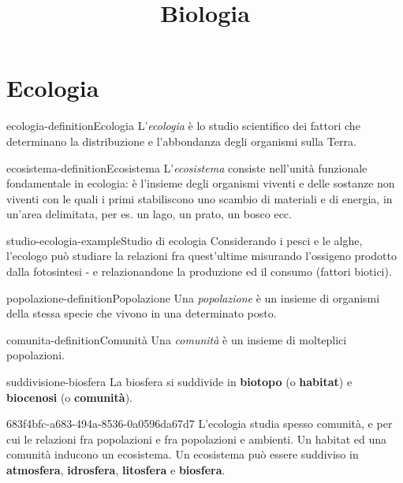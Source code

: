 \documentclass[preview]{standalone}
\begin{document}
\title{Biologia}
\genpage

\section{Ecologia}

\begin{snippetdefinition}{ecologia-definition}{Ecologia}
    L'\textit{ecologia} è lo studio scientifico dei fattori che determinano la
    distribuzione e l'abbondanza degli organismi sulla Terra.
\end{snippetdefinition}

\begin{snippetdefinition}{ecosistema-definition}{Ecosistema}
    L'\textit{ecosistema} consiste nell'unità funzionale fondamentale in ecologia: è
    l'insieme degli organismi viventi e delle sostanze non viventi
    con le quali i primi stabiliscono uno scambio di materiali e di
    energia, in un'area delimitata, per es. un lago, un prato, un
    bosco ecc.
\end{snippetdefinition}


\begin{snippetexample}{studio-ecologia-example}{Studio di ecologia}
    Considerando i pesci e le alghe, l'ecologo può studiare la relazioni fra
    quest'ultime misurando l'ossigeno prodotto dalla fotosintesi - e relazionandone
    la produzione ed il consumo (fattori biotici).
\end{snippetexample}

\begin{snippetdefinition}{popolazione-definition}{Popolazione}
    Una \textit{popolazione} è un insieme di organismi della stessa
    specie che vivono in una determinato posto.
\end{snippetdefinition}

\begin{snippetdefinition}{comunita-definition}{Comunità}
    Una \textit{comunità} è un insieme di molteplici popolazioni.
\end{snippetdefinition}


\begin{snippet}{suddivisione-biosfera}
    La biosfera si suddivide in \textbf{biotopo} (o \textbf{habitat}) e \textbf{biocenosi} (o \textbf{comunità}).
\end{snippet}

\begin{snippet}{683f4bfc-a683-494a-8536-0a0596da67d7}
    L'ecologia studia spesso comunità, e per cui le relazioni fra popolazioni e fra popolazioni
    e ambienti. Un habitat ed una comunità inducono un ecosistema.
    Un ecosistema può essere suddiviso in \textbf{atmosfera}, \textbf{idrosfera}, \textbf{litosfera}
    e \textbf{biosfera}.
\end{snippet}
\end{document}
